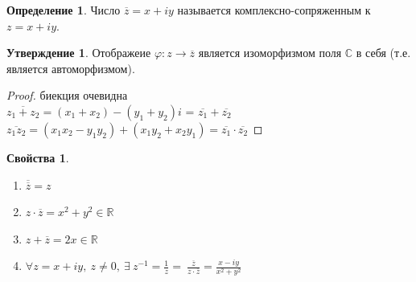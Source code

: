 \documentclass[a4paper, 12pt]{article}
\newcommand{\R}{\mathbb R}
\renewcommand{\phi}{\varphi}
\newcommand\tab[1][.5cm]{\hspace*{#1}}
\theoremstyle{definition}
\newtheorem*{definition}{Определение}
\newtheorem*{subtheorem}{Утверждение}
\newtheorem*{properties}{Свойства}
\begin{document}
  \begin{definition}
    Число $\overline{z} = x+iy$ называется комплексно-сопряженным к\\ $z = x+iy$.
  \end{definition} 
  \begin{subtheorem}
    Отображеие $\phi: z \to \overline{z}$ является изоморфизмом поля $\mathbb{C}$ в себя (т.е. является автоморфизмом). 
  \end{subtheorem} 
  \begin{proof}
    биекция очевидна \\
    $\overline{z_1+z_2} = (x_1 + x_2)-(y_1+y_2)i$  = $\overline{z_1}+\overline{z_2}$\\
    $\overline{z_1z_2} = (x_1x_2-y_1y_2)+(x_1y_2+x_2y_1) = \overline{z_1}\cdot \overline{z_2}$  
  \end{proof} 
  \begin{properties}\tab
    \begin{enumerate}
      \item $\overline{\overline{z}} = z$
      \item $z \cdot \overline{z} = x^2 + y^2 \in \R$
      \item $ z + \overline{z} = 2x \in \R$ 
      \item $ \forall z = x + iy, \ z \neq 0, \ \exists \ z^{-1} = \frac{1}{z} = \ \frac{\overline{z}}{z \cdot \overline{z}} = \frac{x-iy}{x^2 + y^2}$   
    \end{enumerate}
  \end{properties}
\end{document}
